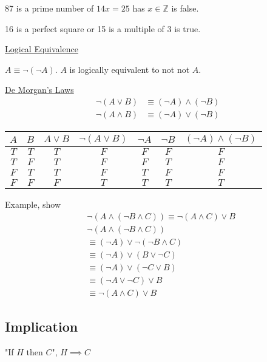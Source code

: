 \documentclass{article}
\begin{document}
87 is a prime number of $14x=25$ has $x \in \mathbb{Z}$ is false.

16 is a perfect square or 15 is a multiple of 3 is true.


\underline{Logical Equivalence}

$A \equiv \neg(\neg A)$. $A$ is logically equivalent to not not $A$.

\underline{De Morgan's Laws}
\begin{align*}
    \neg (A \vee B) &\equiv (\neg A) \wedge (\neg B) \\
    \neg (A \wedge B) &\equiv (\neg A) \vee (\neg B)
\end{align*}


\begin{table}[!h]
    \centering
    \begin{tabular}{|c|c|c|c|c|c|c|} \hline 
         $A$& $B$ & $A \vee B$ & $\neg(A \vee B)$ & $\neg A$ & $\neg B$ & $(\neg A) \wedge (\neg B)$\\ \hline 
         $T$ & $T$ & $T$ & $F$ & $F$ & $F$ & $F$\\ \hline 
         $T$ &  $F$& $T$ & $F$ & $F$ & $T$ & $F$\\ \hline 
         $F$& $T$ & $T$ & $F$ & $T$ &  $F$& $F$\\ \hline 
         $F$& $F$ & $F$ & $T$ & $T$ & $T$ & $T$\\ \hline
    \end{tabular}
\end{table}

Example, show
\begin{align*}
    &\neg(A \wedge (\neg B \wedge C)) \equiv \neg (A \wedge C) \vee B \\
    &\neg(A \wedge(\neg B \wedge C)) \\
    &\equiv (\neg A) \vee \neg(\neg B \wedge C) \\
    &\equiv (\neg A) \vee (B \vee \neg C) \\
    &\equiv (\neg A) \vee (\neg C \vee B) \\
    &\equiv (\neg A \vee \neg C) \vee B \\
    &\equiv \neg(A \wedge C) \vee B
\end{align*}


\subsection{Implication}

"If $H$ then $C$", $H \implies C$
\end{document}
